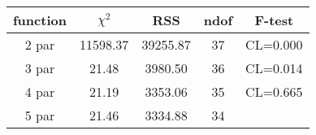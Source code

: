 \begin{tabular}{c|c|c|c|c}
function & $\chi^2$ & RSS & ndof & F-test \\
\hline
2 par & 11598.37 & 39255.87 & 37 & CL=0.000 \\
3 par & 21.48 & 3980.50 & 36 & CL=0.014 \\
4 par & 21.19 & 3353.06 & 35 & CL=0.665 \\
5 par & 21.46 & 3334.88 & 34 & \\
\hline
\end{tabular}